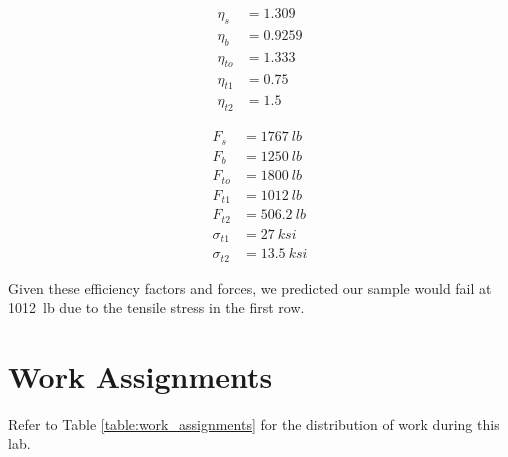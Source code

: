 \documentclass[12 pt]{article}
\begin{document}
\begin{align*}
\eta_s&=\num{1.309} \\
\eta_b&=\num{0.9259} \\
\eta_{to}&=\num{1.333} \\
\eta_{t1}&=\num{0.75} \\
\eta_{t2}&=\num{1.5}
\end{align*}

\begin{align*}
F_s&=\qty{1767}{lb} \\
F_b&=\qty{1250}{lb} \\
F_{to}&=\qty{1800}{lb} \\
F_{t1}&=\qty{1012}{lb} \\
F_{t2}&=\qty{506.2}{lb} \\
\sigma_{t1}&=\qty{27}{ksi} \\
\sigma_{t2}&=\qty{13.5}{ksi}
\end{align*}

Given these efficiency factors and forces, we predicted our sample would fail at \qty{1012}{lb} due to the tensile stress in the first row.

\section{Work Assignments} \label{work_assignments}
Refer to Table \ref{table:work_assignments} for the distribution of work during this lab.
\end{document}
